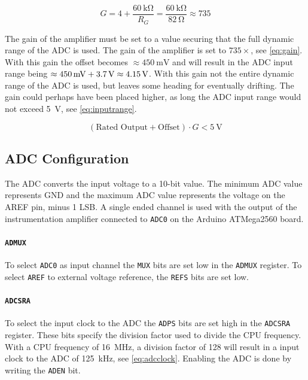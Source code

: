 \begin{equation}
G = 4+\frac{\SI{60}{\kilo\ohm}}{R_G}=\frac{\SI{60}{\kilo\ohm}}{\SI{82}{\ohm}} \approx 735
\label{eq:gain}
\end{equation}

The gain of the amplifier must be set to a value securing that the full dynamic range of the ADC is used. 
The gain of the amplifier is set to $735\times$, see \cref{eq:gain}. 
With this gain the offset becomes $\approx \SI{450}{\milli\volt}$ and will result in the ADC input range being $\approx \text{\SI{450}{\milli\volt}}+\SI{3.7}{\volt}\approx\SI{4.15}{\volt}$.
With this gain not the entire dynamic range of the ADC is used, but leaves some heading for eventually drifting. 
The gain could perhaps have been placed higher, as long the ADC input range would not exceed \SI{5}{\volt}, see \cref{eq:inputrange}.

\begin{equation}
(\text{Rated Output}+\text{Offset})\cdot G < \SI{5}{\volt}
\label{eq:inputrange}
\end{equation} 

\subsection{ADC Configuration}
The ADC converts the input voltage to a 10-bit value.
The minimum ADC value represents GND and the maximum ADC value represents the voltage on the AREF pin, minus 1 LSB.\cite[p.~269]{ATmega2560}
A single ended channel is used with the output of the instrumentation amplifier connected to \texttt{ADC0} on the Arduino ATMega2560 board. 

\paragraph{\texttt{ADMUX}} 
To select \texttt{ADC0} as input channel the \texttt{MUX} bits are set low in the \texttt{ADMUX} register.
To select \texttt{AREF} to external voltage reference, the \texttt{REFS} bits are set low.

\paragraph{\texttt{ADCSRA}}
To select the input clock to the ADC the \texttt{ADPS} bits are set high in the  \texttt{ADCSRA} register. 
These bits specify the division factor used to divide the CPU frequency. 
With a CPU frequency of \SI{16}{\mega\hertz}, a division factor of 128 will result in a input clock to the ADC of \SI{125}{\kilo\hertz}, see \cref{eq:adcclock}.
Enabling the ADC is done by writing the \texttt{ADEN} bit.

